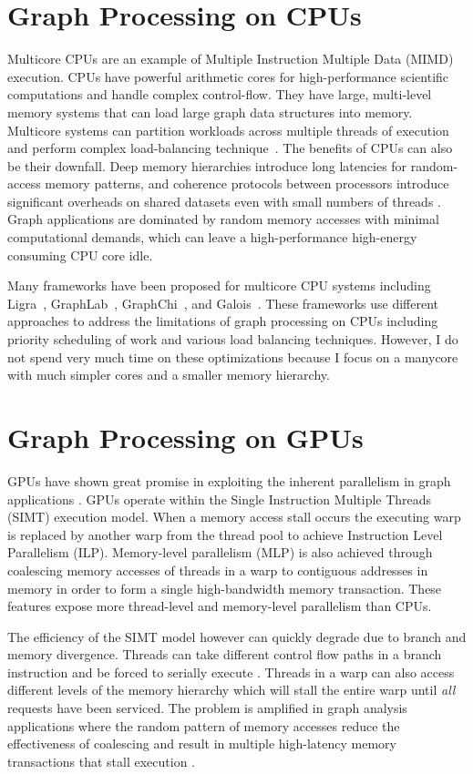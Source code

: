 \section{Graph Processing on CPUs} 
Multicore CPUs are an example of Multiple Instruction Multiple Data (MIMD) execution.
CPUs have powerful arithmetic cores for high-performance scientific computations and handle complex control-flow. 
They have large, multi-level memory systems that can load large graph data structures into memory. 
Multicore systems can partition workloads across multiple threads of execution and perform complex load-balancing technique~\cite{myers2012we}.
The benefits of CPUs can also be their downfall. Deep memory hierarchies introduce long latencies for random-access memory patterns, and coherence protocols between processors introduce significant overheads on shared datasets even with small numbers of threads \cite{lumsdaine2007challenges}.
Graph applications are dominated by random memory accesses with minimal computational demands, which can leave a high-performance high-energy consuming CPU core idle.

Many frameworks have been proposed for multicore CPU systems including Ligra~\cite{shun2013ligra}, GraphLab~\cite{low2010graphlab}, GraphChi~\cite{aapo2012graphchi}, and Galois~\cite{nguyen2013lightweight}.
These frameworks use different approaches to address the limitations of graph processing on CPUs including priority scheduling of work and various load balancing techniques.
However, I do not spend very much time on these optimizations because I focus on a manycore with much simpler cores and a smaller memory hierarchy.

\section{Graph Processing on GPUs} GPUs have shown great promise in exploiting the inherent parallelism in graph applications \cite{liu2016ibfs, mclaughlin2014bcongpus}.
GPUs operate within the Single Instruction Multiple Threads (SIMT) execution model.
When a memory access stall occurs the executing warp is replaced by another warp from the thread pool to achieve Instruction Level Parallelism (ILP).
Memory-level parallelism (MLP) is also achieved through coalescing memory accesses of threads in a warp to contiguous addresses in memory in order to form a single high-bandwidth memory transaction.
These features expose more thread-level and memory-level parallelism than CPUs. 

The efficiency of the SIMT model however can quickly degrade due to branch and memory divergence. 
Threads can take different control flow paths in a branch instruction and be forced to serially execute \cite{fung2011thread}.
Threads in a warp can also access different levels of the memory hierarchy which will stall the entire warp until \textit{all} requests have been serviced.
The problem is amplified in graph analysis applications where the random pattern of memory accesses reduce the effectiveness of coalescing and result in multiple high-latency memory transactions that stall execution \cite{xu2014graph, shi2018graph}.

